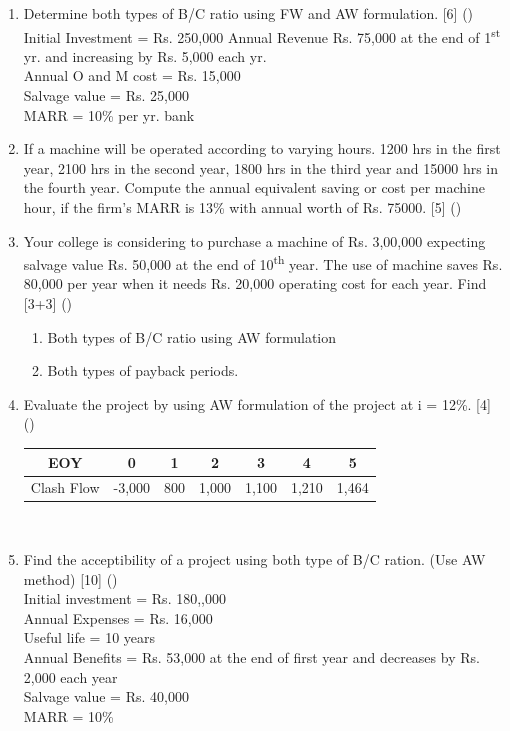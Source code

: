 \documentclass[12pt]{article}
\newcommand{\super}[1]{\textsuperscript{#1}}
\begin{document}
\begin{enumerate}[noitemsep, topsep = 0pt]
		\item Determine both types of B/C ratio using FW and AW formulation. \hfill [6] ()\\
		Initial Investment = Rs. 250,000
		Annual Revenue Rs. 75,000 at the end of 1\super{st} yr. and increasing by Rs. 5,000 each yr.\\
		Annual O and M cost = Rs. 15,000\\
		Salvage value = Rs. 25,000\\
		MARR = 10\% per yr. bank
		
		\item If a machine will be operated according to varying hours. 1200 hrs in the first year, 2100 hrs in the second year, 1800 hrs in the third year and 15000 hrs in the fourth year. Compute the annual equivalent saving or cost per machine hour, if the firm's MARR is 13\% with annual worth of Rs. 75000. \hfill [5] ()
		
		\item Your college is considering to purchase a machine of Rs. 3,00,000 expecting salvage value Rs. 50,000 at the end of 10\super{th} year. The use of machine saves Rs. 80,000 per year when it needs Rs. 20,000 operating cost for each year. Find \hfill [3+3] ()
		\begin{enumerate}[noitemsep, topsep = 0pt, label = \alph*]
			\item Both types of B/C ratio using AW formulation
			\item Both types of payback periods.
		\end{enumerate}
		
		\item Evaluate the project by using AW formulation of the project at i = 12\%. \hfill [4] ()\\
		\begin{tabular}{|c|c|c|c|c|c|c|}
			\hline
			EOY & 0 & 1 & 2 & 3 & 4 & 5\\ \hline
			Clash Flow & -3,000 & 800 & 1,000 & 1,100 & 1,210 & 1,464\\ \hline
		\end{tabular}\\[0pt]
		
		\item Find the acceptibility of a project using both type of B/C ration. (Use AW method) \hfill [10] ()\\
		Initial investment = Rs. 180,,000\\
		Annual Expenses = Rs. 16,000\\
		Useful life = 10 years\\
		Annual Benefits = Rs. 53,000 at the end of first year and decreases by Rs. 2,000 each year\\
		Salvage value = Rs. 40,000\\
		MARR = 10\%
	\end{enumerate}
\end{document}
